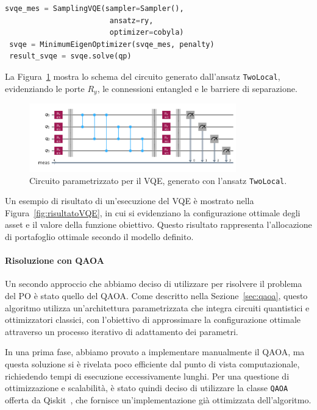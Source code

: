 \begin{lstlisting}[language=python]
 svqe_mes = SamplingVQE(sampler=Sampler(), 
                        ansatz=ry, 
                        optimizer=cobyla)
 svqe = MinimumEigenOptimizer(svqe_mes, penalty)
 result_svqe = svqe.solve(qp)
\end{lstlisting}

La Figura~\ref{fig:vqe_circuit} mostra lo schema del circuito generato dall'ansatz 
\texttt{TwoLocal}, evidenziando le porte $R_y$, le connessioni entangled e le 
barriere di separazione.

\begin{figure}[h!]
    \centering
    \includegraphics[width=0.8\textwidth]{images/circuitoVQE.png}
    \caption{Circuito parametrizzato per il VQE, generato con l'ansatz \texttt{TwoLocal}.}
    \label{fig:vqe_circuit}
\end{figure}

Un esempio di risultato di un'esecuzione del VQE è mostrato nella Figura~\ref{fig:risultatoVQE}, 
in cui si evidenziano la configurazione ottimale degli asset e il valore della 
funzione obiettivo. Questo risultato rappresenta l'allocazione di portafoglio 
ottimale secondo il modello definito.



\paragraph{Risoluzione con QAOA}
Un secondo approccio che abbiamo deciso di utilizzare per risolvere il problema del PO 
è stato quello del QAOA. Come descritto nella Sezione~\ref{sec:qaoa}, questo algoritmo 
utilizza un'architettura parametrizzata che integra circuiti quantistici e ottimizzatori 
classici, con l'obiettivo di approssimare la configurazione ottimale attraverso un 
processo iterativo di adattamento dei parametri.

In una prima fase, abbiamo provato a implementare manualmente il QAOA, ma questa 
soluzione si è rivelata poco efficiente dal punto di vista computazionale, richiedendo 
tempi di esecuzione eccessivamente lunghi. Per una questione di ottimizzazione e 
scalabilità, è stato quindi deciso di utilizzare la classe \texttt{QAOA} offerta da 
Qiskit~\cite{qiskit_portfolio_optimization}, che fornisce un'implementazione già ottimizzata dell'algoritmo.

